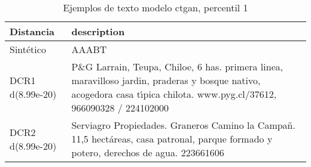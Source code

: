 \begin{table}[H]
\centering
\fontsize{10}{14}\selectfont
\caption{Ejemplos de texto modelo ctgan, percentil 1}
\label{table-example-economicos-b-3-ctgan-1p-text}
\begin{tabular}{|l|m{35em}|}
\hline
\rowcolor[gray]{0.8}
Distancia & description \\
\hline Sintético & AAABT \\
\hline DCR1 d(8.99e-20) & P\&G Larrain, Teupa, Chiloe, 6 has. primera linea, maravilloso jardin, praderas y bosque nativo, acogedora casa t{\'\i}pica chilota. www.pyg.cl/37612, 966090328 / 224102000 \\
\hline DCR2 d(8.99e-20) & Serviagro Propiedades. Graneros Camino la Campa\~n. 11,5 hect\'areas, casa patronal, parque formado y potero, derechos de agua. 223661606 \\
\hline
\end{tabular}
\end{table}
